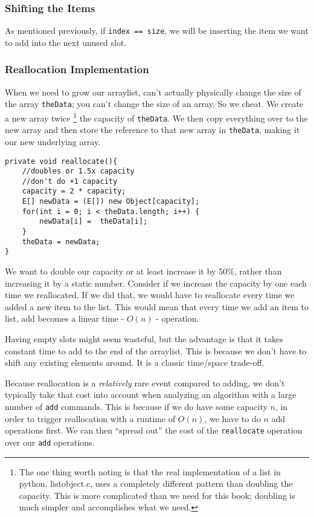 \subsubsection{Shifting the Items}
As mentioned previously, if \texttt{index == size}, we will be inserting the item we want to add into the next unused slot.


\subsubsection{Reallocation Implementation}
\label{arraylist-reallocate}
When we need to grow our arraylist, can't actually physically change the size of the array \texttt{theData}; you can't change the size of an array.
So we cheat.
We create a new array twice \footnote{  The one thing worth noting is that the real implementation of a list in python, listobject.c, uses a completely different pattern than doubling the capacity.  This is more complicated than we need for this book; doubling is much simpler and accomplishes what we need.} the capacity of \texttt{theData}.
We then copy everything over to the new array and then store the reference to that new array in \texttt{theData}, making it our new underlying array. 





\begin{verbatim}
private void reallocate(){
	//doubles or 1.5x capacity
	//don't do +1 capacity
	capacity = 2 * capacity;
	E[] newData = (E[]) new Object[capacity];
	for(int i = 0; i < theData.length; i++) {
		newData[i] =  theData[i];
	}
	theData = newData;
}
\end{verbatim}

We want to double our capacity or at least increase it by 50\%, rather than increasing it by a static number.
Consider if we increase the capacity by one each time we reallocated.  
If we did that, we would have to reallocate every time we added a new item to the list.  
This would mean that every time we add an item to list, add becomes a linear time - $O(n)$ - operation.


Having empty slots might seem wasteful, but the advantage is that it takes constant time to add to the end of the arraylist.  This is because we don't have to shift any existing elements around.  It is a classic time/space trade-off.

Because reallocation is a \textit{relatively} rare event compared to adding, we don't typically take that cost into account when analyzing an algorithm with a large number of \texttt{add} commands.  This is because if we do have some capacity $n$, in order to trigger reallocation with a runtime of $O(n)$, we have to do $n$ add operations first.
We can then ``spread out'' the cost of the \texttt{reallocate} operation over our \texttt{add} operations.


